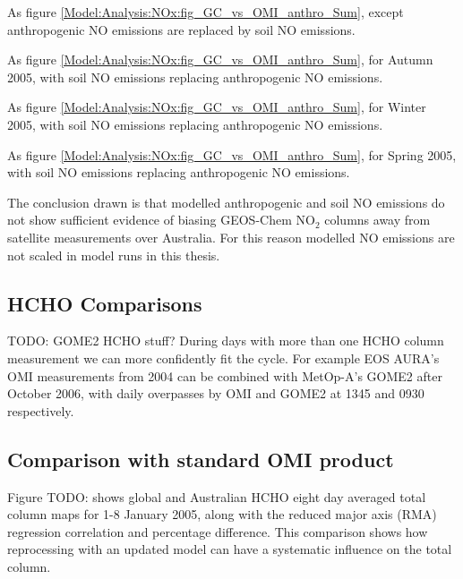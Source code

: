       {As figure \ref{Model:Analysis:NOx:fig_GC_vs_OMI_anthro_Sum}, except anthropogenic NO emissions are replaced by soil NO emissions.}
      {\label{Model:Analysis:NOx:fig_GC_vs_OMI_soil_Sum}}
    
      {As figure \ref{Model:Analysis:NOx:fig_GC_vs_OMI_anthro_Sum}, for Autumn 2005, with soil NO emissions replacing anthropogenic NO emissions.}
      {\label{Model:Analysis:NOx:fig_GC_vs_OMI_soil_Aut}}
      
      {As figure \ref{Model:Analysis:NOx:fig_GC_vs_OMI_anthro_Sum}, for Winter 2005, with soil NO emissions replacing anthropogenic NO emissions.}
      {\label{Model:Analysis:NOx:fig_GC_vs_OMI_soil_Win}}
      
      {As figure \ref{Model:Analysis:NOx:fig_GC_vs_OMI_anthro_Sum}, for Spring 2005, with soil NO emissions replacing anthropogenic NO emissions.}
      {\label{Model:Analysis:NOx:fig_GC_vs_OMI_soil_Spr}}
    
    The conclusion drawn is that modelled anthropogenic and soil NO emissions do not show sufficient evidence of biasing GEOS-Chem NO$_2$ columns away from satellite measurements over Australia.
    For this reason modelled NO emissions are not scaled in model runs in this thesis.

    
  \subsection{HCHO Comparisons}
    TODO: GOME2 HCHO stuff?
    During days with more than one HCHO column measurement we can more confidently fit the cycle. 
    For example EOS AURA's OMI measurements from 2004 can be combined with MetOp-A's GOME2 after October 2006, with daily overpasses by OMI and GOME2 at 1345 and 0930 respectively.
    
    
  \subsection{Comparison with standard OMI product}
    Figure TODO: shows global and Australian HCHO eight day averaged total column maps for 1-8 January 2005, along with the reduced major axis (RMA) regression correlation and percentage difference.
    This comparison shows how reprocessing with an updated model can have a systematic influence on the total column.
    
